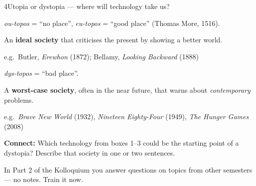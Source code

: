 \begin{wsbox}{4}{Utopia or dystopia — where will technology take us?}
\begin{minipage}[t]{0.485\linewidth}\vspace{0pt}
\begin{goodbox}
\kl{\textcolor{good}{Utopia}} \enspace \emph{ou-topos} = “no place”, \emph{eu-topos} = “good place” (Thomas More, 1516).\par
An \textbf{ideal society} that criticises the present by showing a better world.\par
{\footnotesize e.g.\ Butler, \emph{Erewhon} (1872); Bellamy, \emph{Looking Backward} (1888)}
\end{goodbox}
\end{minipage}\hfill
\begin{minipage}[t]{0.485\linewidth}\vspace{0pt}
\begin{badbox}
\kl{\textcolor{bad}{Dystopia}} \enspace \emph{dys-topos} = “bad place”.\par
A \textbf{worst-case society}, often in the near future, that warns about \emph{contemporary} problems.\par
{\footnotesize e.g.\ \emph{Brave New World} (1932), \emph{Nineteen Eighty-Four} (1949), \emph{The Hunger Games} (2008)}
\end{badbox}
\end{minipage}
\par\vspace{1.2mm}
\textcolor{sec}{\small\textbf{Connect:} Which technology from boxes 1–3 could be the starting point of a dystopia? Describe that society in one or two sentences.}
\end{wsbox}

\newpage
{}%
{In Part 2 of the Kolloquium you answer questions on topics from other semesters — no notes. Train it now.}

